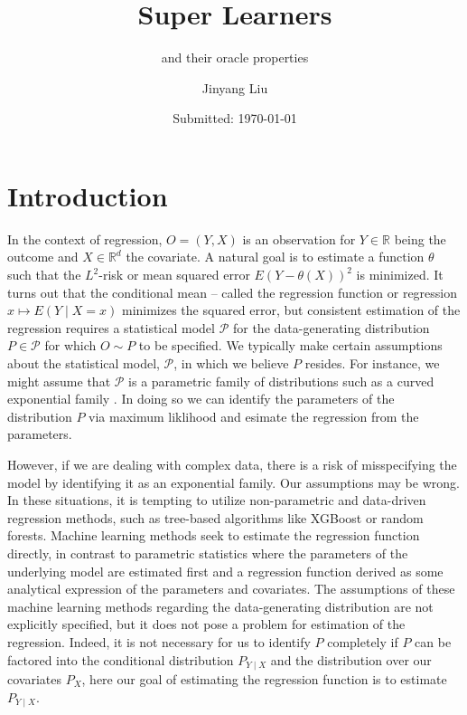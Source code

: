 \documentclass[11pt, a4paper]{article}
\author{Jinyang Liu}
\title{Super Learners}
\subtitle{and their oracle properties}
\date{Submitted: \today}
\theoremstyle{definition}
\theoremstyle{remark}
\begin{document}
\begingroup
    \selectfont %
    \maketitle
    \thispagestyle{empty} 
    
    \newpage
    \thispagestyle{empty} 
    
    \newpage
    \thispagestyle{empty} 
    \tableofcontents
    \newpage
\endgroup

\pagestyle{fancy}
\section{Introduction}
In the context of regression, $ O = (Y, X) $ is an observation for $ Y \in \mathbb{R} $ being the outcome and $ X \in \mathbb{R}^{d} $ the covariate. A natural goal is to estimate a function $ \theta $ such that the $ L^2 $-risk or mean squared error $ E(Y - \theta(X))^2 $ is minimized. It turns out that the conditional mean -- called the regression function or regression $ x \mapsto E(Y \mid X = x) $ minimizes the squared error, but consistent estimation of the regression requires a statistical model $ \mathcal{P} $ for the data-generating distribution $ P \in \mathcal{P} $ for which $ O \sim P $ to be specified. We typically make certain assumptions about the statistical model, $\mathcal{P}$, in which we believe $P$ resides. For instance, we might assume that $\mathcal{P}$ is a parametric family of distributions such as a curved exponential family \parencite{lauritzen2023fundamentals}. In doing so we can identify the parameters of the distribution $ P $ via maximum liklihood and esimate the regression from the parameters.

However, if we are dealing with complex data, there is a risk of misspecifying the model by identifying it as an exponential family. Our assumptions may be wrong. In these situations, it is tempting to utilize non-parametric and data-driven regression methods, such as tree-based algorithms like XGBoost or random forests. Machine learning methods seek to estimate the regression function directly, in contrast to parametric statistics where the parameters of the underlying model are estimated first and a regression function derived as some analytical expression of the parameters and covariates. The assumptions of these machine learning methods regarding the data-generating distribution are not explicitly specified, but it does not pose a problem for estimation of the regression. Indeed, it is not necessary for us to identify $ P $ completely if $ P $ can be factored into the conditional distribution $ P_{Y \mid X} $ and the distribution over our covariates $ P_X $, here our goal of estimating the regression function is to estimate $ P_{Y \mid X} $.   
\end{document}
